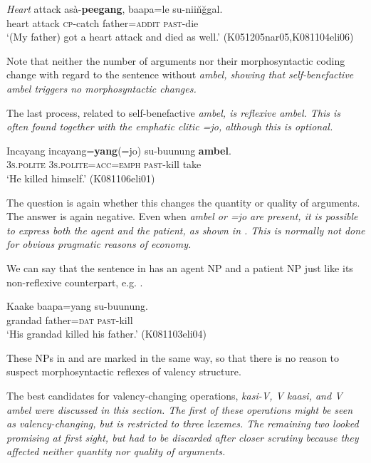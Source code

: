 \documentclass[a4paper,10pt]{article}
\begin{document}
\ea\label{ex:vector:ambel:noambel}
\gll \zero{} {\em Heart} attack asà-\textbf{peegang},   baapa=le       su-nii\u n\u ggal. \\
      {  } heart attack \textsc{cp}-catch father=\textsc{addit} \textsc{past}-die\\
    `(My father) got a heart attack and died as well.' (K051205nar05,K081104eli06)%
\z

Note that neither the number of arguments nor their morphosyntactic coding change with regard to the sentence without \em ambel\em, showing that self-benefactive \em ambel \em triggers no morphosyntactic changes.

The last process, related to self-benefactive \em ambel\em, is reflexive \em ambel\em. This is often found together with the emphatic clitic \em =jo\em, although this is optional.


\ea \label{ex:vector:ambel:refl}
\gll Incayang incayang=\textbf{yang}(=jo) su-buunung \textbf{ambel}. \\
       \textsc{3s.polite} \textsc{3s.polite}=\textsc{acc}=\textsc{emph} \textsc{past}-kill take \\
    `He killed himself.' (K081106eli01) %
\z


The question is again whether this changes the quantity or quality of arguments. The answer is again negative. Even when \em ambel \em or \em =jo \em are present, it is possible to express both the agent and the patient, as shown in . This is normally not done for obvious pragmatic reasons of economy.

We can say that the sentence in  has an agent NP and a patient NP just like its non-reflexive counterpart, e.g. .

\ea\label{ex:vector:ambel:contr}
\gll Kaake baapa=yang su-buunung. \\
      grandad father=\textsc{dat} \textsc{past}-kill \\
    `His grandad  killed his father.'   (K081103eli04)
\z

These NPs in  and  are marked in the same way, so that there is no reason to suspect morphosyntactic reflexes of valency structure.

The best candidates for valency-changing operations, \em kasi\em-V, V \em kaasi\em, and \em V ambel \em were discussed in this section. The first of these operations might be seen as valency-changing, but is restricted to three lexemes. The remaining two looked promising at first sight, but had to be discarded after closer scrutiny because they affected neither quantity nor quality of arguments.
\end{document}
